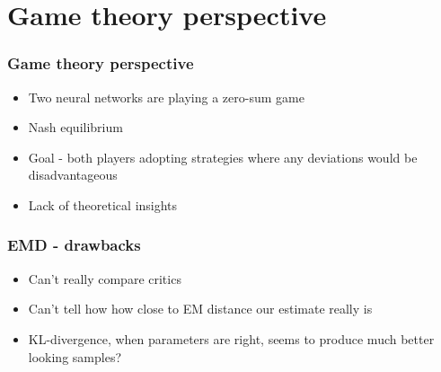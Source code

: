 \documentclass{Bredelebeamer}
\begin{document}

\section{Game theory perspective}
\begin{frame}
	\frametitle{Game theory perspective}
	\begin{itemize}
		\item Two neural networks are playing a zero-sum game
		\item Nash equilibrium
		\item Goal - both players adopting strategies where any deviations would be disadvantageous
		\item Lack of theoretical insights
	\end{itemize}
\end{frame}

\begin{frame}
	\frametitle{EMD - drawbacks}
	\begin{itemize}
		\item Can't really compare critics
		\item Can't tell how how close to EM distance our estimate really is
		\item KL-divergence, when parameters are right, seems to produce much better looking samples?
	\end{itemize}
\end{frame}
\end{document}
